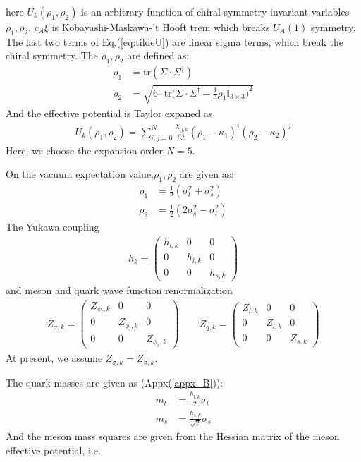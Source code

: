\documentclass[12pt]{article}
\begin{document}
here $U_k(\rho_1,\rho_2)$ is an arbitrary function of chiral symmetry invariant variables $\rho_1,\rho_2$.  $ c_A \xi$ is Kobayashi-Maskawa-’t Hooft trem which breaks $U_A(1)$ symmetry. The last two terms of Eq.(\ref{eq:tildeU}) are linear sigma terms, which break the chiral symmetry. The $\rho_1,\rho_2$ are defined as:
\begin{align}
\rho_1&=\text{tr}(\Sigma \cdot \Sigma ^\dagger) \\
\rho_2&=\sqrt{6 \cdot \text{tr}\bigg (\Sigma \cdot \Sigma ^\dagger-\frac{1}{3} \rho_1 \mathbb{I}_{3 \times 3} \bigg )^2 }
\end{align}
And the effective potential is Taylor expaned as
\begin{align}
U_{k} (\rho_1,\rho_2)=\sum_{i,j=0}^N \frac{\lambda_{ij,k}}{i!j!}(\rho_1 -\kappa_1)^i(\rho_2-\kappa_2)^j
\end{align}
Here, we choose the expansion order $N=5$.

On the vacuum expectation value,$\rho_1,\rho_2$ are given as:
\begin{align}
\rho_1&=\frac{1}{2}(\sigma_l^2+\sigma_s^2)\\
\rho_2&=\frac{1}{2}(2 \sigma_s^2-\sigma_l^2)
\end{align}
The Yukawa coupling 
\begin{align}
h_k=\begin{pmatrix} 
h_{l,k}&0&0\\
0&h_{l,k}&0\\
0&0&h_{s,k}
\end{pmatrix}
\end{align}
and meson and quark wave function renormalization
\begin{align}
Z_{\sigma,k}=\begin{pmatrix} 
Z_{\phi_l,k}&0&0\\
0&Z_{\phi_l,k}&0\\
0&0&Z_{\phi_s,k}
\end{pmatrix} 
\quad \quad
Z_{q,k}=\begin{pmatrix} 
Z_{l,k}&0&0\\
0&Z_{l,k}&0\\
0&0&Z_{s,k}
\end{pmatrix} 
\end{align}
At present, we assume $Z_{\sigma,k}=Z_{\pi,k}$.

The quark masses are given as (Appx(\ref{appx_B})):
 \begin{align}\label{quarkmass_eq}
m_l&=\frac{h_{l,k}}{2}\sigma_l \\
m_s&=\frac{h_{s,k}}{\sqrt{2}}\sigma_s
\end{align}
And the meson mass squares are given from the Hessian matrix of the meson effective potential, i.e.
\end{document}
